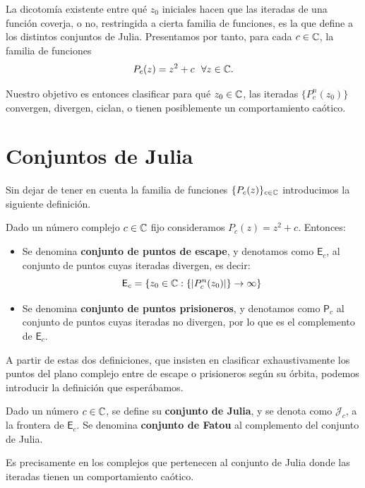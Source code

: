 La dicotomía existente entre qué $z_0$ iniciales hacen que las iteradas de una función coverja, o no, restringida a cierta familia de funciones, es la que define a los distintos conjuntos de Julia. Presentamos por tanto, para cada $c\in\mathbb{C}$, la familia de funciones
\begin{equation}
  P_c(z) = z^2 +c \ \ \forall z\in\mathbb{C}.
\end{equation}

Nuestro objetivo es entonces clasificar para qué $z_0\in\mathbb{C}$, las iteradas $\{P_c^n(z_0)\}$ convergen, divergen, ciclan, o tienen posiblemente un comportamiento caótico.

\section{Conjuntos de Julia}
\label{section:Julia}

Sin dejar de tener en cuenta la familia de funciones $\{P_c(z)\}_{c\in\mathbb{C}}$ introducimos la siguiente definición.

\begin{definicion}
  Dado un número complejo $c\in\mathbb{C}$ fijo consideramos $P_c(z)=z^2+c$. Entonces:
  \begin{itemize}
    \item Se denomina \textbf{conjunto de puntos de escape}, y denotamos como $\mathsf{E}_c$, al conjunto de puntos cuyas iteradas divergen, es decir:
    $$
    \mathsf{E}_c = \{z_0\in\mathbb{C}: \{|P_c^n(z_0)|\}\rightarrow \infty \}
    $$
    \item  Se denomina \textbf{conjunto de puntos prisioneros}, y denotamos como $\mathsf{P}_c$ al conjunto de puntos cuyas iteradas no divergen, por lo que es el complemento de $\mathsf{E}_c$.
  \end{itemize}
\end{definicion}

A partir de estas dos definiciones, que insisten en clasificar exhaustivamente los puntos del plano complejo entre de escape o prisioneros según su órbita, podemos introducir la definición que esperábamos.

\begin{definicion}
Dado un número $c\in\mathbb{C}$, se define su \textbf{conjunto de Julia}, y se denota como $\mathcal{J}_c$, a la frontera de $\mathsf{E}_c$. Se denomina \textbf{conjunto de Fatou} al complemento del conjunto de Julia.
\end{definicion}

Es precisamente en los complejos que pertenecen al conjunto de Julia donde las iteradas tienen un comportamiento caótico.

